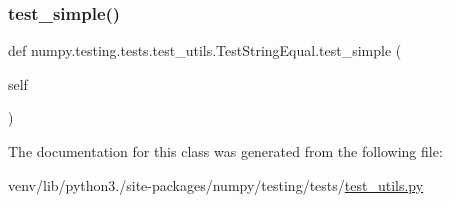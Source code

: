 \mbox{\label{classnumpy_1_1testing_1_1tests_1_1test__utils_1_1TestStringEqual_ace8c309cec9a314ef3c97b2fa29c4164}} 
\subsubsection{\texorpdfstring{test\+\_\+simple()}{test\_simple()}}
{\footnotesize\ttfamily def numpy.\+testing.\+tests.\+test\+\_\+utils.\+Test\+String\+Equal.\+test\+\_\+simple (\begin{DoxyParamCaption}\item[{}]{self }\end{DoxyParamCaption})}



The documentation for this class was generated from the following file\+:\begin{DoxyCompactItemize}
\item 
venv/lib/python3./site-\/packages/numpy/testing/tests/\hyperlink{numpy_2testing_2tests_2test__utils_8py}{test\+\_\+utils.\+py}\end{DoxyCompactItemize}
